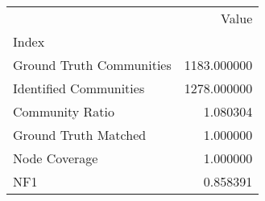 \begin{tabular}{lr}
\toprule
{} &        Value \\
Index                    &              \\
\midrule
Ground Truth Communities &  1183.000000 \\
Identified Communities   &  1278.000000 \\
Community Ratio          &     1.080304 \\
Ground Truth Matched     &     1.000000 \\
Node Coverage            &     1.000000 \\
NF1                      &     0.858391 \\
\bottomrule
\end{tabular}
